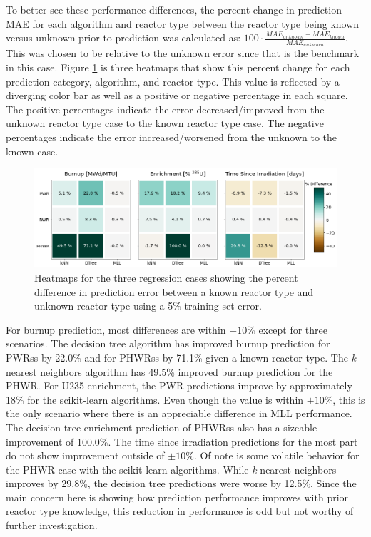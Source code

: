 To better see these performance differences, the percent change in prediction
\gls{MAE} for each algorithm and reactor type between the reactor type being
known versus unknown prior to prediction was calculated as: $100 \cdot
\frac{MAE_{unknown} - MAE_{known}}{MAE_{unknown}}$.  This was chosen to be
relative to the unknown error since that is the benchmark in this case.  Figure
\ref{fig:knownrxtr} is three heatmaps that show this percent change for each
prediction category, algorithm, and reactor type.  This value is reflected by a
diverging color bar as well as a positive or negative percentage in each
square.  The positive percentages indicate the error decreased/improved from
the unknown reactor type case to the known reactor type case.  The negative
percentages indicate the error increased/worsened from the unknown to the known
case. 

\begin{figure}[!htb]
  \centering
  \includegraphics[width=\textwidth]{./chapters/exp1/rxtr-type_known-unknown_diff_err05.png}
  \caption[Heatmaps for three regression cases comparing known versus 
           unknown reactor type prior knowledge]
          {Heatmaps for the three regression cases showing the percent 
           difference in prediction error between a known reactor type 
           and unknown reactor type using a 5\% training set error.}
  \label{fig:knownrxtr}
\end{figure}

For burnup prediction, most differences are within $\pm10\%$ except for three
scenarios.  The decision tree algorithm has improved burnup prediction for
\glspl{PWR}s by 22.0\% and for \glspl{PHWR}s by 71.1\% given a known reactor
type.  The \textit{k}-nearest neighbors algorithm has 49.5\% improved burnup
prediction for the \gls{PHWR}. For \gls{U235} enrichment, the \gls{PWR}
predictions improve by approximately 18\% for the scikit-learn algorithms.
Even though the value is within $\pm10\%$, this is the only scenario where
there is an appreciable difference in \gls{MLL} performance. The decision tree
enrichment prediction of \glspl{PHWR}s also has a sizeable improvement of
100.0\%.  The time since irradiation predictions for the most part do not show
improvement outside of $\pm10\%$. Of note is some volatile behavior for the
\gls{PHWR} case with the scikit-learn algorithms.  While \textit{k}-nearest
neighbors improves by 29.8\%, the decision tree predictions were worse by
12.5\%.  Since the main concern here is showing how prediction performance
improves with prior reactor type knowledge, this reduction in performance is
odd but not worthy of further investigation.

